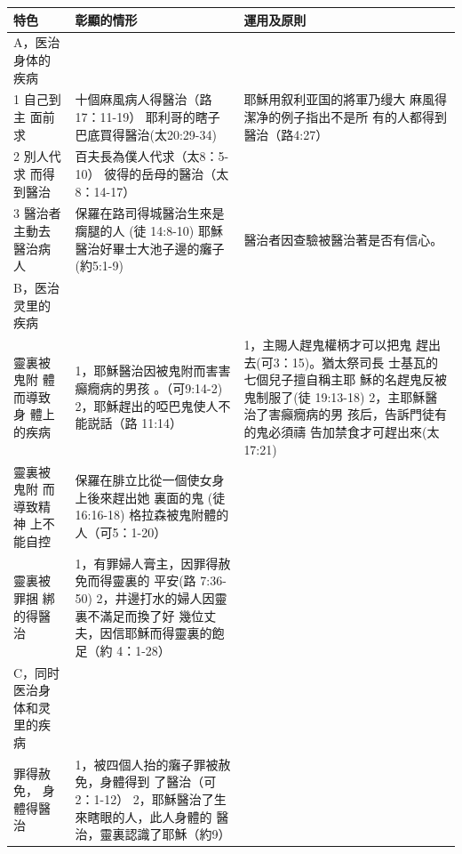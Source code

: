 \begin{table}[htbp]
  \centering
    \begin{tabular}{p{15.145em}|p{15.785em}|p{16.5em}}    \toprule
\multicolumn{1}{p{15.215em}|}{\textbf{特色}} & \multicolumn{1}{p{15.215em}|}{\textbf{彰顯的情形}} &\multicolumn{1}{p{15em}|}{\textbf{運用及原則}} \\
    \midrule
A，医治身体的疾病&&\\    \midrule
1 自己到主
面前求&

十個麻風病人得醫治（路17：11-19）
耶利哥的瞎子巴底買得醫治(太20:29-34)&

耶穌用叙利亚国的將軍乃缦大
麻風得潔净的例子指出不是所
有的人都得到醫治（路4:27）\\    \midrule

2 別人代求
而得到醫治&

百夫長為僕人代求（太8：5-10）
彼得的岳母的醫治（太8：14-17）&\\    \midrule

3 醫治者主動去醫治病
人&保羅在路司得城醫治生來是瘸腿的人 (徒 
14:8-10)
耶穌醫治好畢士大池子邊的癱子(約5:1-9)&
醫治者因查驗被醫治著是否有信心。\\    \midrule

B，医治灵里的疾病&&\\    \midrule
靈裏被鬼附
體而導致身
體上的疾病&

1，耶穌醫治因被鬼附而害害癲癇病的男孩
。（可9:14-2)
2，耶穌趕出的啞巴鬼使人不能説話（路
11:14）&

1，主賜人趕鬼權柄才可以把鬼
趕出去(可3：15)。猶太祭司長
士基瓦的七個兒子擅自稱主耶
穌的名趕鬼反被鬼制服了(徒
19:13-18)
2，主耶穌醫治了害癲癇病的男
孩后，告訴門徒有的鬼必須禱
告加禁食才可趕出來(太17:21)\\    \midrule

靈裏被鬼附
而導致精神
上不能自控&

保羅在腓立比從一個使女身上後來趕出她
裏面的鬼 (徒16:16-18)
格拉森被鬼附體的人（可5：1-20）&\\    \midrule

靈裏被罪捆
綁的得醫治&

1，有罪婦人膏主，因罪得赦免而得靈裏的
平安(路 7:36-50)
2，井邊打水的婦人因靈裏不滿足而換了好
幾位丈夫，因信耶穌而得靈裏的飽足（約
4：1-28）&\\    \midrule
C，同时医治身体和灵里的疾病&&\\    \midrule
罪得赦免，
身體得醫治&

1，被四個人抬的癱子罪被赦免，身體得到
了醫治（可2：1-12）
2，耶穌醫治了生來瞎眼的人，此人身體的
醫治，靈裏認識了耶穌（約9）&


\end{tabular}
\end{table}
